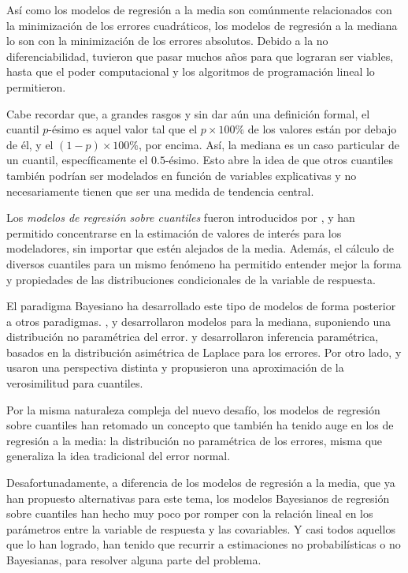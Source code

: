 As\'i como los modelos de regresi\'on a la media son com\'unmente relacionados con la minimizaci\'on de los errores cuadr\'aticos, los modelos de regresi\'on a la mediana lo son con la minimizaci\'on de los errores absolutos. Debido a la no diferenciabilidad, tuvieron que pasar muchos años para que lograran ser viables, hasta que el poder computacional y los algoritmos de programaci\'on lineal lo permitieron.

Cabe recordar que, a grandes rasgos y sin dar a\'un una definici\'on formal, el cuantil $p$-\'esimo es aquel valor tal que el $p \times 100\%$ de los valores est\'an por debajo de \'el, y el $(1-p)\times 100\%$, por encima. As\'i, la mediana es un caso particular de un cuantil, espec\'ificamente el $0.5$-\'esimo. Esto abre la idea de que otros cuantiles tambi\'en podr\'ian ser modelados en funci\'on de variables explicativas y no necesariamente tienen que ser una medida de tendencia central. 

Los \textit{modelos de regresi\'on sobre cuantiles} fueron introducidos por \cite{Koenker_QuantReg}, y han permitido concentrarse en la estimaci\'on de valores de inter\'es para los modeladores, sin importar que est\'en alejados de la media. Adem\'as, el c\'alculo de diversos cuantiles para un mismo fen\'omeno ha permitido entender mejor la forma y propiedades de las distribuciones condicionales de la variable de respuesta.

El paradigma Bayesiano ha desarrollado este tipo de modelos de forma posterior a otros paradigmas. \cite{Walker_BayesAccFail}, \cite{Kottas_BaySemiparamMed} y \cite{Hanson_PolyaTrees} desarrollaron modelos para la mediana, suponiendo una distribuci\'on no param\'etrica del error. \cite{Yu_BayQuantReg} y \cite{Tsionas_BayQuantInf} desarrollaron inferencia param\'etrica, basados en la distribuci\'on asim\'etrica de Laplace para los errores. Por otro lado, \cite{Lavine_LikeQuant} y \cite{Dunson_ApproxBayes} usaron una perspectiva distinta y propusieron una aproximaci\'on de la verosimilitud para cuantiles.

Por la misma naturaleza compleja del nuevo desaf\'io, los modelos de regresi\'on sobre cuantiles han retomado un concepto que tambi\'en ha tenido auge en los de regresi\'on a la media: la distribuci\'on no param\'etrica de los errores, misma que generaliza la idea tradicional del error normal. 

Desafortunadamente, a diferencia de los modelos de regresi\'on a la media, que ya han propuesto alternativas para este tema, los modelos Bayesianos de regresi\'on sobre cuantiles han hecho muy poco por romper con la relaci\'on lineal en los par\'ametros entre la variable de respuesta y las covariables. Y casi todos aquellos que lo han logrado, han tenido que recurrir a estimaciones no probabil\'isticas o no Bayesianas, para resolver alguna parte del problema.

